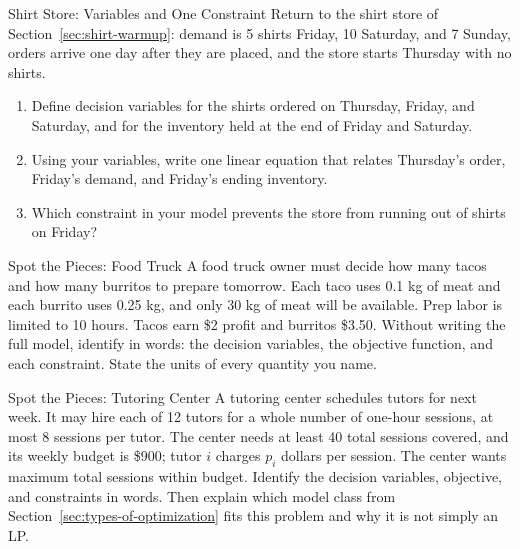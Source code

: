 
\begin{ex}{Shirt Store: Variables and One Constraint}{}
\label{ex:shirt-friday-balance}
 Return to the shirt store of Section~\ref{sec:shirt-warmup}: demand is 5 shirts Friday, 10 Saturday, and 7 Sunday, orders arrive one day after they are placed, and the store starts Thursday with no shirts.
\begin{enumerate}
\item Define decision variables for the shirts ordered on Thursday, Friday, and Saturday, and for the inventory held at the end of Friday and Saturday.
\item Using your variables, write one linear equation that relates Thursday's order, Friday's demand, and Friday's ending inventory.
\item Which constraint in your model prevents the store from running out of shirts on Friday?
\end{enumerate}
\end{ex}

\begin{ex}{Spot the Pieces: Food Truck}{}
 A food truck owner must decide how many tacos and how many burritos to prepare tomorrow.  Each taco uses 0.1 kg of meat and each burrito uses 0.25 kg, and only 30 kg of meat will be available.  Prep labor is limited to 10 hours.  Tacos earn \$2 profit and burritos \$3.50.  Without writing the full model, identify in words: the decision variables, the objective function, and each constraint.  State the units of every quantity you name.
\end{ex}

\begin{ex}{Spot the Pieces: Tutoring Center}{}
 A tutoring center schedules tutors for next week.  It may hire each of 12 tutors for a whole number of one-hour sessions, at most 8 sessions per tutor.  The center needs at least 40 total sessions covered, and its weekly budget is \$900; tutor $i$ charges $p_i$ dollars per session.  The center wants maximum total sessions within budget.  Identify the decision variables, objective, and constraints in words.  Then explain which model class from Section~\ref{sec:types-of-optimization} fits this problem and why it is not simply an LP.
\exrefs{\S\ref{sec:what-is-MP}, \S\ref{sec:types-of-optimization}}
\end{ex}


